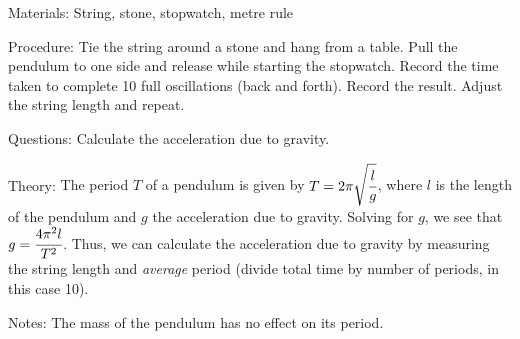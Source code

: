 \begin{multicols}{2}
\begin{description*}
\item[Materials:]{String, stone, stopwatch, metre rule}
\item[Procedure:]{Tie the string around a stone and hang from a table. Pull the pendulum to one side and release while starting the stopwatch. Record the time taken to complete 10 full oscillations (back and forth). Record the result. Adjust the string length and repeat.}
\item[Questions:]{Calculate the acceleration due to gravity.}
\item[Theory:]{The period $T$ of a pendulum is given by $T = 2\pi\sqrt{\cfrac{l}{g}}$, where $l$ is the length of the pendulum and $g$ the acceleration due to gravity. Solving for $g$, we see that $g = \cfrac{4\pi^2l}{T^2}$. Thus, we can calculate the acceleration due to gravity by measuring the string length and \emph{average} period (divide total time by number of periods, in this case 10).}
\item[Notes:]{The mass of the pendulum has no effect on its period.}
\end{description*}






\end{multicols}

\pagebreak